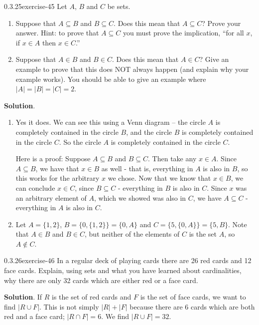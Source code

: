 \documentclass[twoside,11pt,]{book}
\numberwithin{equation}{chapter}
\begin{document}
\begin{divisionsolution}{0.3.25}{}{exercise-45}%
\hypertarget{p-769}{}%
Let \(A\), \(B\) and \(C\) be sets.\leavevmode%
\begin{enumerate}[label=(\alph*)]
\item\hypertarget{li-682}{}\hypertarget{p-770}{}%
Suppose that \(A \subseteq B\) and \(B \subseteq C\). Does this mean that \(A \subseteq C\)? Prove your answer. Hint: to prove that \(A \subseteq C\) you must prove the implication, ``for all \(x\), if \(x \in A\) then \(x \in C\).''%
\item\hypertarget{li-683}{}\hypertarget{p-771}{}%
Suppose that \(A \in B\) and \(B \in C\). Does this mean that \(A \in C\)? Give an example to prove that this does NOT always happen (and explain why your example works). You should be able to give an example where \(|A| = |B| = |C| = 2\).%
\end{enumerate}
%
\par\smallskip%
\noindent\textbf{Solution}.\quad%
\hypertarget{p-772}{}%
\leavevmode%
\begin{enumerate}[label=(\alph*)]
\item\hypertarget{li-684}{}\hypertarget{p-773}{}%
Yes it does. We can see this using a Venn diagram -- the circle \(A\) is completely contained in the circle \(B\), and the circle \(B\) is completely contained in the circle \(C\). So the circle \(A\) is completely contained in the circle \(C\).%
\par
\hypertarget{p-774}{}%
Here is a proof: Suppose \(A \subseteq B\) and \(B \subseteq C\). Then take any \(x \in A\). Since \(A \subseteq B\), we have that \(x \in B\) as well - that is, everything in \(A\) is also in \(B\), so this works for the arbitrary \(x\) we chose. Now that we know that \(x \in B\), we can conclude \(x \in C\), since \(B \subseteq C\) - everything in \(B\) is also in \(C\). Since \(x\) was an arbitrary element of \(A\), which we showed was also in \(C\), we have \(A \subseteq C\) - everything in \(A\) is also in \(C\).%
\item\hypertarget{li-685}{}\hypertarget{p-775}{}%
Let \(A = \{1,2\}\), \(B = \{0, \{1,2\}\} = \{0, A\}\) and \(C = \{5, \{0, A\}\} = \{5, B\}\). Note that \(A \in B\) and \(B \in C\), but neither of the elements of \(C\) is the set \(A\), so \(A \notin C\).%
\end{enumerate}
%
\end{divisionsolution}%
\begin{divisionsolution}{0.3.26}{}{exercise-46}%
\hypertarget{p-776}{}%
In a regular deck of playing cards there are 26 red cards and 12 face cards. Explain, using sets and what you have learned about cardinalities, why there are only 32 cards which are either red or a face card.%
\par\smallskip%
\noindent\textbf{Solution}.\quad%
\hypertarget{p-777}{}%
If \(R\) is the set of red cards and \(F\) is the set of face cards, we want to find \(|R \cup F|\). This is not simply \(|R| + |F|\) because there are 6 cards which are both red and a face card; \(|R \cap F| = 6\). We find \(|R \cup F| = 32\).%
\end{divisionsolution}%
\end{document}
